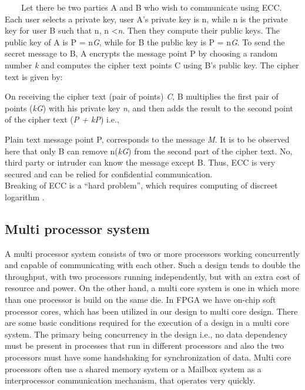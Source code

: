 \documentclass[preprint,12pt]{elsarticle}
\begin{document}
\ \ \ \ Let there be two parties A and B who wish to communicate using ECC.  Each user selects a private key, user A's private key is n, while n is the private key for user B such that n, n  \textless \emph{n}. Then they compute their public keys. The public key  of A is P =  n\emph{G}, while for B the public key  is P =  n\emph{G}. To send the secret message to B, A encrypts the message point P  by choosing a random number \emph{k} and computes the cipher text points  C using B's public key. The cipher text is given by:
 
On receiving the cipher text (pair of points) \emph{C}, B multiplies the first pair of points (\emph{k}\emph{G}) with his private key \emph{n}, and then adds the result to the second point of the cipher text (\emph{P + kP}) i.e.,
 
Plain text message point P, corresponds to the message \emph{M}. It is to be observed here that only B can remove n(\emph{k}\emph{G}) from the second part of the cipher text. No, third party or intruder can know the message except B. Thus, ECC is very secured and can be relied for confidential communication.\\
Breaking of ECC is a ``hard problem'', which requires computing of discreet logarithm \cite{stalling}. 
\subsection{Multi processor system} 
\label{mps}
A multi processor system consists of two or more processors working concurrently and capable of communicating with each other. Such a design tends to double the throughput, with two processors running independently, but with an extra cost of resource and power. On the other hand, a multi core system is one in which more than one processor is build on the same die. In FPGA we have on-chip soft processor cores, which has been utilized in our design to  multi core design. There are some basic conditions required for the execution of a design in a multi core system. The primary being concurrency in the design i.e., no data dependency must be present in processes that run in different processors and also the two processors must have some handshaking for synchronization of data.  Multi core processors often use a shared memory system or a Mailbox system as a interprocessor communication mechanism, that operates very quickly\cite{multicore}.
\end{document}
